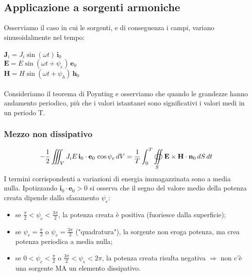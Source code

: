 \documentclass[a4paper]{article}
\begin{document}
\subsection*{Applicazione a sorgenti armoniche}
Osserviamo il caso in cui le sorgenti, e di conseguenza i campi, variano sinusoidalmente nel tempo:\\\\
\hspace*{40mm}$\textbf{J}_i=J_i\sin(\omega t)\,\textbf{i}_0$\\
\hspace*{40mm}$\textbf{E}=E\sin(\omega t+\psi_e)\,\textbf{e}_0$\\
\hspace*{40mm}$\textbf{H}=H\sin(\omega t+\psi_h)\,\textbf{h}_0$\\\\
Consideriamo il teorema di Poynting e osserviamo che quando le grandezze hanno andamento periodico, più che i valori istantanei sono significativi i valori medi in un periodo T.
\subsubsection*{Mezzo non dissipativo}
\begin{equation*}
-\frac{1}{2}\iiint_{V}J_iE\,\textbf{i}_0\cdot\textbf{e}_0\,\cos\psi_e\,dV=\frac{1}{T}\int_0^T\oiint_{S}\textbf{E}\times\textbf{H}\cdot\textbf{n}_0\,dS\,dt\\
\end{equation*}
I termini corrispondenti a variazioni di energia immagazzinata sono a media nulla. Ipotizzando $\textbf{i}_0\cdot\textbf{e}_0>0$ si osserva che il segno del valore medio della potenza creata dipende dallo sfasamento $\psi_e$:
\begin{itemize}
\item se $\frac{\pi}{2}<\psi_e<\frac{3\pi}{2}$, la potenza creata è positiva (fuoriesce dalla superficie);
\item se $\psi_e=\frac{\pi}{2}$ o $\psi_e=\frac{3\pi}{2}$ ("quadratura"), la sorgente non eroga potenza, ma crea potenza periodica a media nulla;
\item se $0<\psi_e<\frac{\pi}{2}$ o $\frac{3\pi}{2}<\psi_e<2\pi$, la potenza creata risulta negativa $\Rightarrow$ non c'è una sorgente MA un elemento dissipativo.
\end{itemize}
\end{document}
